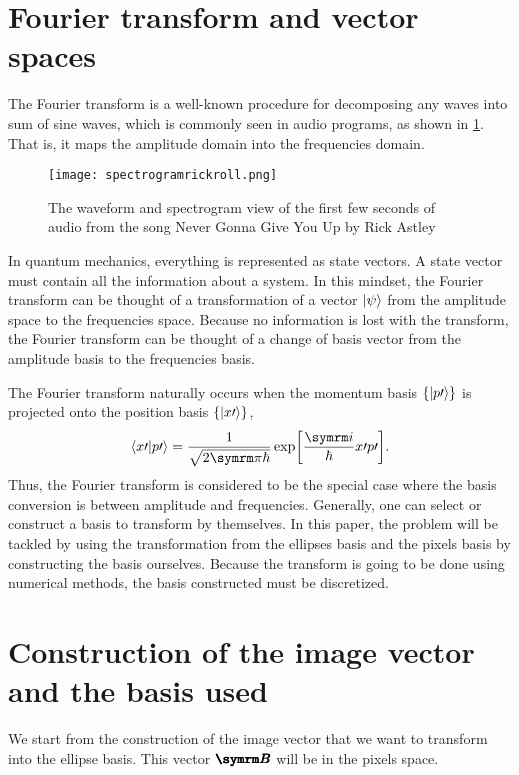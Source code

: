\section{Fourier transform and vector spaces}

The Fourier transform is a well-known procedure for decomposing any waves into sum of sine waves, which is commonly seen in audio programs, as shown in \cref{fig:audiogram}. That is, it maps the amplitude domain into the frequencies domain.
\begin{figure}[ht]
    \centering
    \texttt{[image: spectrogramrickroll.png]}
    \caption{The waveform and spectrogram view of the first few seconds of audio from the song Never Gonna Give You Up by Rick Astley}
    \label{fig:audiogram}
\end{figure}

In quantum mechanics, everything is represented as state vectors. A state vector must contain all the information about a system. In this mindset, the Fourier transform can be thought of a transformation of a vector $\ket{\psi}$ from the amplitude space to the frequencies space. Because no information is lost with the transform, the Fourier transform can be thought of a change of basis vector from the amplitude basis to the frequencies basis.

The Fourier transform naturally occurs when the momentum basis $\{\ket{p\prime}\}$ is projected onto the position basis $\{\ket{x\prime}\}$,
\begin{equation}
    \braket{x\prime}{p\prime} = \frac{1}{\sqrt{2\cpi\hbar}}\exp[\frac{\iu}{\hbar}x\prime p\prime].
\end{equation}
Thus, the Fourier transform is considered to be the special case where the basis conversion is between amplitude and frequencies. Generally, one can select or construct a basis to transform by themselves. In this paper, the problem will be tackled by using the transformation from the ellipses basis and the pixels basis by constructing the basis ourselves. Because the transform is going to be done using numerical methods, the basis constructed must be discretized.

\section{Construction of the image vector and the basis used}

We start from the construction of the image vector that we want to transform into the ellipse basis. This vector $\vv{B}$ will be in the pixels space.

